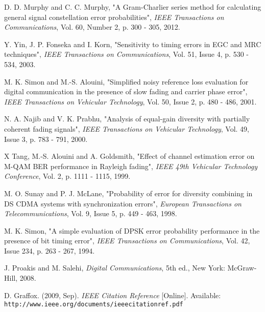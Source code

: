 
%
%
%
%
%
%

\begin{thebibliography}{99}

\bibitem{[1]}
D. D. Murphy and C. C. Murphy, "A Gram-Charlier series method for calculating general signal constellation error probabilities", \emph{IEEE Transactions on Communications}, Vol. 60, Number 2, p. 300 - 305, 2012.

\bibitem{[2]}
Y. Yin, J. P. Fonseka and I. Korn, "Sensitivity to timing errors in EGC and MRC techniques", \emph{IEEE Transactions on Communications}, Vol. 51, Issue 4, p. 530 - 534, 2003.

\bibitem{[3]}
M. K. Simon and M.-S. Alouini, "Simplified noisy reference loss evaluation for digital communication in the presence of slow fading and carrier phase error", \emph{IEEE Transactions on Vehicular Technology}, Vol. 50, Issue 2, p. 480 - 486, 2001.

\bibitem{[4]}
N. A. Najib and V. K. Prabhu, "Analysis of equal-gain diversity with partially coherent fading signals", \emph{IEEE Transactions on Vehicular Technology}, Vol. 49, Issue 3, p. 783 - 791, 2000.

\bibitem{[5]}
X Tang, M.-S. Alouini and A. Goldsmith, "Effect of channel estimation error on M-QAM BER performance in Rayleigh fading", \emph{IEEE 49th Vehicular Technology Conference}, Vol. 2, p. 1111 - 1115, 1999.

\bibitem{[6]}
M. O. Sunay and P. J. McLane, "Probability of error for diversity combining in DS CDMA systems with synchronization errors", \emph{European Transactions on Telecommunications}, Vol. 9, Issue 5, p. 449 - 463, 1998.

\bibitem{[7]}
M. K. Simon, "A simple evaluation of DPSK error probability performance in the presence of bit timing error", \emph{IEEE Transactions on Communications}, Vol. 42, Issue 234, p. 263 - 267, 1994.

\bibitem{[8]}
J. Proakis and M. Salehi, \emph{Digital Communications}, 5th ed., New York: McGraw-Hill, 2008.

\bibitem{[20]}
D. Graffox. (2009, Sep). \emph{IEEE Citation Reference} [Online]. Available: \texttt{http://www.ieee.org/documents/ieeecitationref.pdf}

\end{thebibliography}
